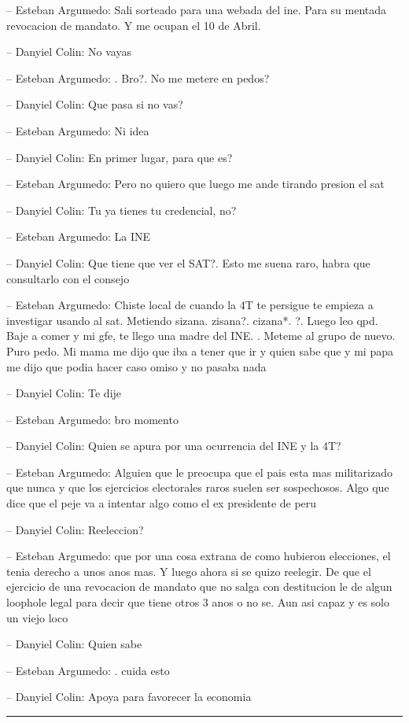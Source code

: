 -- Esteban Argumedo: Sali sorteado para una webada del ine. Para su
mentada revocacion de mandato. Y me ocupan el 10 de Abril.

-- Danyiel Colin: No vayas

-- Esteban Argumedo: . Bro?. No me metere en pedos?

-- Danyiel Colin: Que pasa si no vas?

-- Esteban Argumedo: Ni idea

-- Danyiel Colin: En primer lugar, para que es?

-- Esteban Argumedo: Pero no quiero que luego me ande tirando presion el
sat

-- Danyiel Colin: Tu ya tienes tu credencial, no?

-- Esteban Argumedo: La INE

-- Danyiel Colin: Que tiene que ver el SAT?. Esto me suena raro, habra
que consultarlo con el consejo

-- Esteban Argumedo: Chiste local de cuando la 4T te persigue te empieza
a investigar usando al sat. Metiendo sizana. zisana?. cizana*. ?. Luego
leo qpd. Baje a comer y mi gfe, te llego una madre del INE. . Meteme al
grupo de nuevo. Puro pedo. Mi mama me dijo que iba a tener que ir y
quien sabe que y mi papa me dijo que podia hacer caso omiso y no pasaba
nada

-- Danyiel Colin: Te dije

-- Esteban Argumedo: bro momento

-- Danyiel Colin: Quien se apura por una ocurrencia del INE y la 4T?

-- Esteban Argumedo: Alguien que le preocupa que el pais esta mas
militarizado que nunca y que los ejercicios electorales raros suelen ser
sospechosos. Algo que dice que el peje va a intentar algo como el ex
presidente de peru

-- Danyiel Colin: Reeleccion?

-- Esteban Argumedo: que por una cosa extrana de como hubieron
elecciones, el tenia derecho a unos anos mas. Y luego ahora si se quizo
reelegir. De que el ejercicio de una revocacion de mandato que no salga
con destitucion le de algun loophole legal para decir que tiene otros 3
anos o no se. Aun asi capaz y es solo un viejo loco

-- Danyiel Colin: Quien sabe

-- Esteban Argumedo: . cuida esto

-- Danyiel Colin: Apoya para favorecer la economia

\begin{center}\rule{0.5\linewidth}{0.5pt}\end{center}

